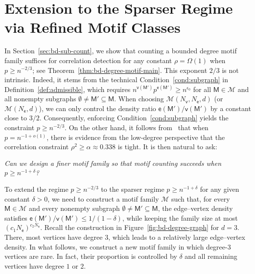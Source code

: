 \documentclass[letterpaper,11pt]{article}
\theoremstyle{definition}
\newcommand{\maM}{\mathcal{M}}
\newcommand{\en}{\mathsf{{e}}}
\newcommand{\vn}{\mathsf{{v}}}
\newcommand{\sfM}{{\mathsf{M}}}
\newcommand{\sfe}{{\mathsf{e}}}
\newcommand{\sfv}{{\mathsf{v}}}
\begin{document}
\section{Extension to the Sparser Regime via Refined Motif Classes}\label{sec:refined-results}

In Section~\ref{sec:bd-sub-count}, we show that counting a bounded degree motif family suffices for correlation detection for any constant $\rho=\Omega(1)$ when $p\ge n^{-2/3}$; see Theorem~\ref{thm:bd-degree-motif-main}. This exponent $2/3$ is not intrinsic. Indeed, it stems from the technical Condition~\ref{cond:subgraph} in Definition~\ref{def:admissible}, which requires $n^{\vn(\sfM')}p^{\en(\sfM')}\ge n^{\epsilon_0}$ for all $\sfM\in\maM$ and all nonempty subgraphs $\emptyset\neq \sfM'\subseteq \sfM$. When choosing $\maM(N_\sfv,N_\sfe,d)$ (or $\maM(N_\sfe,d)$), we can only control the density ratio $\en(\sfM')/\vn(\sfM')$ by a constant close to $3/2$. Consequently, enforcing Condition~\ref{cond:subgraph} yields the constraint $p\ge n^{-2/3}$. On the other hand, it follows from~\cite{ding2023low} that when $p=n^{-1+o(1)}$, there is evidence from the low-degree perspective that the correlation constraint $\rho^2\ge \alpha\approx 0.338$ is tight. It is then natural to ask:
\begin{center}
\emph{Can we design a finer motif family so that motif counting succeeds when $p\ge n^{-1+\delta}$?}
\end{center}


To extend the regime $p\ge n^{-2/3}$ to the sparser regime $p\ge n^{-1+\delta}$ for any given constant $\delta>0$, we need to construct a motif family $\maM$ such that, for every $\sfM\in\maM$ and every nonempty subgraph $\emptyset\neq \sfM'\subseteq \sfM$, the edge--vertex density satisfies $\en(\sfM')/\vn(\sfM')\le 1/(1-\delta)$, while keeping the family size at most $(c_1 N_\sfe)^{c_2 N_\sfe}$. Recall the construction in Figure~\ref{fig:bd-degree-graph} for $d=3$. There, most vertices have degree $3$, which leads to a relatively large edge--vertex density. In what follows, we construct a new motif family in which degree-$3$ vertices are rare. In fact, their proportion is controlled by $\delta$ and all remaining vertices have degree $1$ or $2$.
\end{document}
